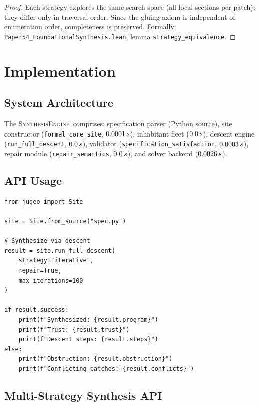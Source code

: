 \documentclass[11pt]{article}
\newcommand{\SynthEngine}{\textsc{SynthesisEngine}}
\newcommand{\RunDescent}{\texttt{run\_full\_descent}}
\newcommand{\SpecSat}{\texttt{specification\_satisfaction}}
\newcommand{\RepairSem}{\texttt{repair\_semantics}}
\begin{document}
\begin{proof}
Each strategy explores the same search space (all local sections per
patch); they differ only in traversal order.  Since the gluing axiom
is independent of enumeration order, completeness is preserved.
Formally: \texttt{Paper54\_FoundationalSynthesis.lean}, lemma
\texttt{strategy\_equivalence}.
\end{proof}

\section{Implementation}\label{sec:implementation}

\subsection{System Architecture}
The \SynthEngine\ comprises: specification parser (Python source),
site constructor (\texttt{formal\_core\_site}, $0.0001\,s$),
inhabitant fleet ($0.0\,s$),
descent engine (\RunDescent, $0.0\,s$),
validator (\SpecSat, $0.0003\,s$),
repair module (\RepairSem, $0.0\,s$),
and solver backend ($0.0026\,s$).

\subsection{API Usage}
\begin{lstlisting}[style=jugeo-python]
from jugeo import Site

site = Site.from_source("spec.py")

# Synthesize via descent
result = site.run_full_descent(
    strategy="iterative",
    repair=True,
    max_iterations=100
)

if result.success:
    print(f"Synthesized: {result.program}")
    print(f"Trust: {result.trust}")
    print(f"Descent steps: {result.steps}")
else:
    print(f"Obstruction: {result.obstruction}")
    print(f"Conflicting patches: {result.conflicts}")
\end{lstlisting}

\subsection{Multi-Strategy Synthesis API}
\end{document}
